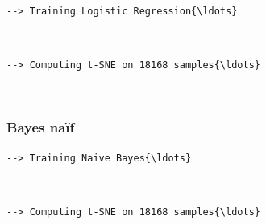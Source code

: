 \documentclass[11pt]{article}
\begin{document}
\begin{Verbatim}[commandchars=\\\{\}]
  --> Training Logistic Regression{\ldots}
\end{Verbatim}

\begin{center}
\end{center}
{ \hspace*{\fill} \\}

\begin{Verbatim}[commandchars=\\\{\}]
  --> Computing t-SNE on 18168 samples{\ldots}
\end{Verbatim}

\begin{center}
\end{center}
{ \hspace*{\fill} \\}

\subsubsection{Bayes naïf}\label{bayes-nauxeff}

\begin{Verbatim}[commandchars=\\\{\}]
  --> Training Naive Bayes{\ldots}
\end{Verbatim}

\begin{center}
\end{center}
{ \hspace*{\fill} \\}

\begin{Verbatim}[commandchars=\\\{\}]
  --> Computing t-SNE on 18168 samples{\ldots}
\end{Verbatim}

\begin{center}
\end{center}
{ \hspace*{\fill} \\}
\end{document}
